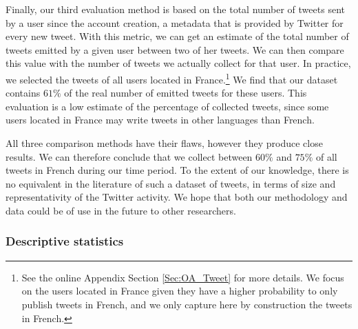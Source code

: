Finally, our third evaluation method is based on the total number of tweets sent by a user since the account creation, a metadata that is provided by Twitter for every new tweet. With this metric, we can get an estimate of the total number of tweets emitted by a given user between two of her tweets. We can then compare this value with the number of tweets we actually collect for that user. In practice, we selected the tweets of all users located in France.\footnote{See the online Appendix Section \ref{Sec:OA_Tweet} for more details. We focus on the users located in France given they have a higher probability to only publish tweets in French, and we only capture here by construction the tweets in French.} We find that our dataset contains $61\%$ of the real number of emitted tweets for these users. This evaluation is a low estimate of the percentage of collected tweets, since some users located in France may write tweets in other languages than French. 

All three comparison methods have their flaws, however they produce close results. We can therefore conclude that we collect between $60\%$ and $75\%$ of all tweets in French during our time period. To the extent of our knowledge, there is no equivalent in the literature of such a dataset of tweets, in terms of size and representativity of the Twitter activity. We hope that both our methodology and data could be of use in the future to other researchers.


\subsubsection{Descriptive statistics}

